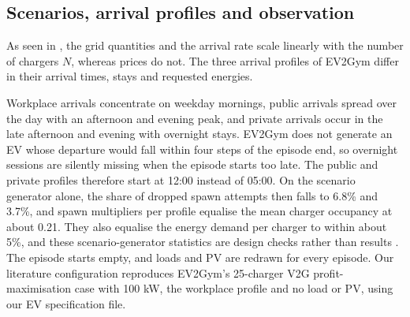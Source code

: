 \subsection{Scenarios, arrival profiles and observation}\label{app:scenarios}

As seen in , the grid quantities and the arrival rate scale linearly with the number of chargers $N$, whereas prices do not.
The three arrival profiles of EV2Gym differ in their arrival times, stays and requested energies.

Workplace arrivals concentrate on weekday mornings, public arrivals spread over the day with an afternoon and evening peak, and private arrivals occur in the late afternoon and evening with overnight stays.
EV2Gym does not generate an EV whose departure would fall within four steps of the episode end, so overnight sessions are silently missing when the episode starts too late.
The public and private profiles therefore start at 12:00 instead of 05:00.
On the scenario generator alone, the share of dropped spawn attempts then falls to 6.8\% and 3.7\%, and spawn multipliers per profile equalise the mean charger occupancy at about 0.21.
They also equalise the energy demand per charger to within about 5\%, and these scenario-generator statistics are design checks rather than results .
The episode starts empty, and loads and PV are redrawn for every episode.
Our literature configuration reproduces EV2Gym's 25-charger V2G profit-maximisation case with 100 kW, the workplace profile and no load or PV, using our EV specification file.

